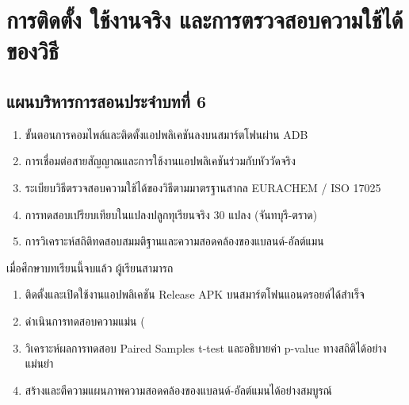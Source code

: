 \chapter{การติดตั้ง ใช้งานจริง และการตรวจสอบความใช้ได้ของวิธี}
\label{chap:ch06}

\section*{แผนบริหารการสอนประจำบทที่ 6}

\begin{tcolorbox}[
    enhanced, breakable,
    colback=white, colframe=rbruNavy,
    fonttitle=\bfseries\color{white},
    title={1. หัวข้อเนื้อหาประจำบท},
    arc=1.5mm, boxrule=0.8pt, leftrule=3.5mm
]
\begin{enumerate}
    \item ขั้นตอนการคอมไพล์และติดตั้งแอปพลิเคชันลงบนสมาร์ตโฟนผ่าน ADB
    \item การเชื่อมต่อสายสัญญาณและการใช้งานแอปพลิเคชันร่วมกับหัววัดจริง
    \item ระเบียบวิธีตรวจสอบความใช้ได้ของวิธีตามมาตรฐานสากล EURACHEM / ISO 17025
    \item การทดสอบเปรียบเทียบในแปลงปลูกทุเรียนจริง 30 แปลง (จันทบุรี-ตราด)
    \item การวิเคราะห์สถิติทดสอบสมมติฐานและความสอดคล้องของแบลนด์-อัลต์แมน
\end{enumerate}
\end{tcolorbox}

\begin{tcolorbox}[
    enhanced, breakable,
    colback=white, colframe=rbruNavy,
    fonttitle=\bfseries\color{white},
    title={2. วัตถุประสงค์เชิงพฤติกรรม},
    arc=1.5mm, boxrule=0.8pt, leftrule=3.5mm
]
เมื่อศึกษาบทเรียนนี้จบแล้ว ผู้เรียนสามารถ
\begin{enumerate}
    \item ติดตั้งและเปิดใช้งานแอปพลิเคชัน Release APK บนสมาร์ตโฟนแอนดรอยด์ได้สำเร็จ
    \item ดำเนินการทดสอบความแม่น (%
    \item วิเคราะห์ผลการทดสอบ Paired Samples t-test และอธิบายค่า p-value ทางสถิติได้อย่างแม่นยำ
    \item สร้างและตีความแผนภาพความสอดคล้องของแบลนด์-อัลต์แมนได้อย่างสมบูรณ์
\end{enumerate}
\end{tcolorbox}


